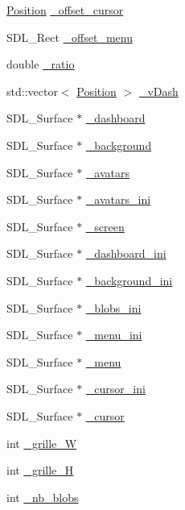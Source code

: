 \begin{DoxyCompactItemize}
\item 
\hyperlink{a00014}{Position} \hyperlink{a00011_a66835fb4e65c2b55a5f49bb2dee0d15d}{\_\-offset\_\-cursor}
\item 
SDL\_\-Rect \hyperlink{a00011_ae0f325eee7cf4b68a4ca9b2400bf8cb3}{\_\-offset\_\-menu}
\item 
double \hyperlink{a00011_aa2a6a332aba9f37ba861a7d9dfcab7c3}{\_\-ratio}
\item 
std::vector$<$ \hyperlink{a00014}{Position} $>$ \hyperlink{a00011_a20e95369c05d8a39c90baea0924d84c1}{\_\-vDash}
\item 
SDL\_\-Surface $\ast$ \hyperlink{a00011_adb0cbbbfa65c44ec89b8eb1b94fd0b5d}{\_\-dashboard}
\item 
SDL\_\-Surface $\ast$ \hyperlink{a00011_a6020a5ecde63a9807c9e9be10cf0ed6f}{\_\-background}
\item 
SDL\_\-Surface $\ast$ \hyperlink{a00011_ad4d9dec8fe3d03b877888634feacbc8e}{\_\-avatars}
\item 
SDL\_\-Surface $\ast$ \hyperlink{a00011_a34d0862fbbbfbf487e623abd4b478f54}{\_\-avatars\_\-ini}
\item 
SDL\_\-Surface $\ast$ \hyperlink{a00011_a24f8420a0d24f9c943dc03ebf09a9b63}{\_\-screen}
\item 
SDL\_\-Surface $\ast$ \hyperlink{a00011_adc79d6b99c7934e04606c0734f535a34}{\_\-dashboard\_\-ini}
\item 
SDL\_\-Surface $\ast$ \hyperlink{a00011_a304a7dbac538a6b5713c20f0affd498e}{\_\-background\_\-ini}
\item 
SDL\_\-Surface $\ast$ \hyperlink{a00011_aafa3c968571905556bb0df1c12330475}{\_\-blobs\_\-ini}
\item 
SDL\_\-Surface $\ast$ \hyperlink{a00011_a86bb002cf9b27e6362f2b48cc9bccf22}{\_\-menu\_\-ini}
\item 
SDL\_\-Surface $\ast$ \hyperlink{a00011_af74c931698aacb8315ad7875a1968300}{\_\-menu}
\item 
SDL\_\-Surface $\ast$ \hyperlink{a00011_aa2ea2d74e3d3e4e9955b2c52b0e41cbc}{\_\-cursor\_\-ini}
\item 
SDL\_\-Surface $\ast$ \hyperlink{a00011_aa88f07cc32a1794d03eb64a52057e093}{\_\-cursor}
\item 
int \hyperlink{a00011_aff377fb4e786e623a8304c50648e7334}{\_\-grille\_\-W}
\item 
int \hyperlink{a00011_a1b9e885d44b84e8c33dd37ca1e1c6f8e}{\_\-grille\_\-H}
\item 
int \hyperlink{a00011_ab7d7e603a5566ea712bcfe630f6dd231}{\_\-nb\_\-blobs}
\item 

\end{DoxyCompactItemize}
